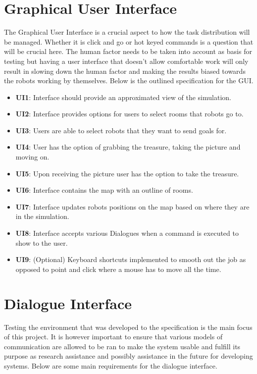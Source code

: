 \documentclass{report}
\begin{document}
    \section{Graphical User Interface}
      The Graphical User Interface is a crucial aspect to how the task distribution will be managed. Whether it is click and go or hot keyed commands is a question that will be crucial here. The human factor needs to be taken into account as basis for testing but having a user interface that doesn't allow comfortable work will only result in slowing down the human factor and making the results biased towards the robots working by themselves. Below is the outlined specification for the GUI.
      
        \begin{itemize}
          \item \textbf{UI1}: Interface should provide an approximated view of the simulation.
          \item \textbf{UI2}: Interface provides options for users to select rooms that robots go to.
          \item \textbf{UI3}: Users are able to select robots that they want to send goals for.
          \item \textbf{UI4}: User has the option of grabbing the treasure, taking the picture and moving on.
          \item \textbf{UI5}: Upon receiving the picture user has the option to take the treasure.
          \item \textbf{UI6}: Interface contains the map with an outline of rooms.
          \item \textbf{UI7}: Interface updates robots positions on the map based on where they are in the simulation.
          \item \textbf{UI8}: Interface accepts various Dialogues when a command is executed to show to the user.
          \item \textbf{UI9}: (Optional) Keyboard shortcuts implemented to smooth out the job as opposed to point and click where a mouse has to move all the time.
        \end{itemize}
    \section{Dialogue Interface}
      Testing the environment that was developed to the specification is the main focus of this project. It is however important to ensure that various models of communication are allowed to be ran to make the system usable and fulfill its purpose as research assistance and possibly assistance in the future for developing systems. Below are some main requirements for the dialogue interface.
\end{document}
